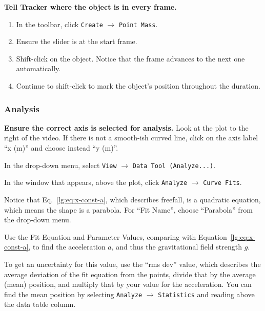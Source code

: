 \begin{steps}
	\item \textbf{Tell Tracker where the object is in every frame.}
	\begin{enumerate}
		\item In the toolbar, click \texttt{Create} $\rightarrow$ \texttt{Point Mass}.
		\item Ensure the slider is at the start frame.
		\item Shift-click on the object. Notice that the frame advances to the next one automatically.
		\item Continue to shift-click to mark the object's position throughout the duration.
	\end{enumerate}
\end{steps}

\subsubsection{Analysis}

\begin{steps}
	\item \textbf{Ensure the correct axis is selected for analysis.} Look at the plot to the right of the video. If there is not a smooth-ish curved line, click on the axis label ``x (m)'' and choose instead ``y (m)''.
	
	\item In the drop-down menu, select \texttt{View} $\rightarrow$ \texttt{Data Tool (Analyze...)}.
	
	\item In the window that appears, above the plot, click \texttt{Analyze} $\rightarrow$ \texttt{Curve Fits}.
	
	\item Notice that Eq.~\ref{lg:eq:x-const-a}, which describes freefall, is a quadratic equation, which means the shape is a parabola. For ``Fit Name'', choose ``Parabola'' from the drop-down menu.
	
	\item Use the Fit Equation and Parameter Values, comparing with Equation~\ref{lg:eq:x-const-a}, to find the acceleration $a$, and thus the gravitational field strength $g$.
	
	\item To get an uncertainty for this value, use the ``rms dev'' value, which describes the average deviation of the fit equation from the points, divide that by the average (mean) position, and multiply that by your value for the acceleration. You can find the mean position by selecting \texttt{Analyze} $\rightarrow$ \texttt{Statistics} and reading above the data table column.
\end{steps}

